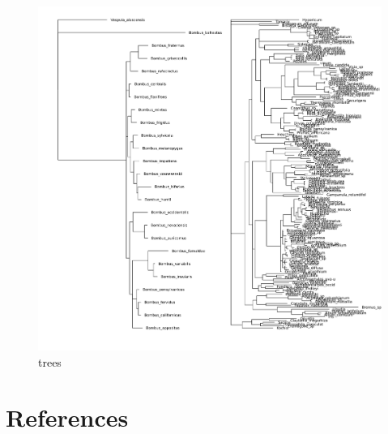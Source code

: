 \documentclass[10pt,oneside]{article}
\makeatletter
\def\maxwidth{\ifdim\Gin@nat@width>\linewidth\linewidth
\else\Gin@nat@width\fi}
\let\Oldincludegraphics\includegraphics
\renewcommand{\includegraphics}[1]{\Oldincludegraphics[width=\maxwidth]{#1}}
\makeatother
\begin{document}
\begin{figure}
\centering
\includegraphics{./figures/trees.png}
\caption{trees}
\end{figure}

\hypertarget{references}{%
\section*{References}\label{references}}
\end{document}
